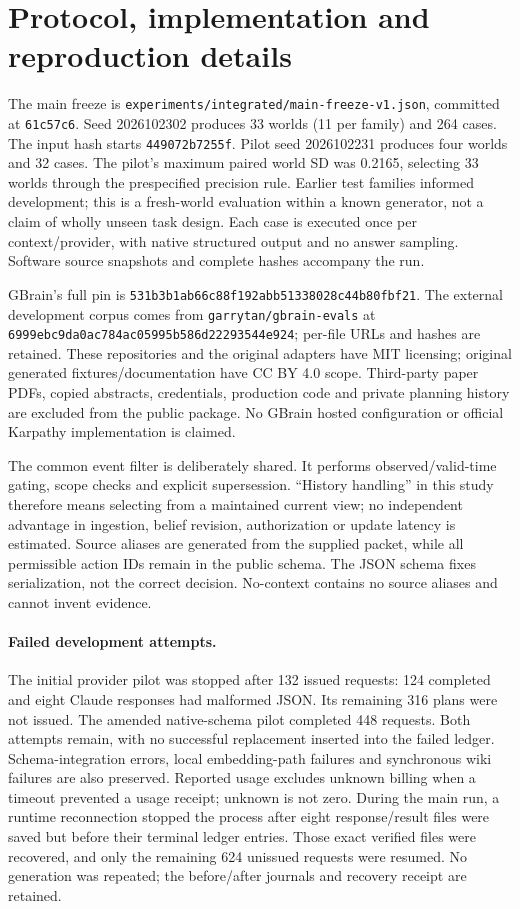 \section{Protocol, implementation and reproduction details}
\label{sec:reproduce}
The main freeze is \texttt{experiments/integrated/main-freeze-v1.json}, committed at \texttt{61c57c6}. Seed 2026102302 produces 33 worlds (11 per family) and 264 cases. The input hash starts \texttt{449072b7255f}. Pilot seed 2026102231 produces four worlds and 32 cases. The pilot's maximum paired world SD was 0.2165, selecting 33 worlds through the prespecified precision rule. Earlier test families informed development; this is a fresh-world evaluation within a known generator, not a claim of wholly unseen task design. Each case is executed once per context/provider, with native structured output and no answer sampling. Software source snapshots and complete hashes accompany the run.

GBrain's full pin is \texttt{531b3b1ab66c88f192abb51338028c44b80fbf21}. The external development corpus comes from \texttt{garrytan/gbrain-evals} at \texttt{6999ebc9da0ac784ac05995b586d22293544e924}; per-file URLs and hashes are retained. These repositories and the original adapters have MIT licensing; original generated fixtures/documentation have CC BY 4.0 scope. Third-party paper PDFs, copied abstracts, credentials, production code and private planning history are excluded from the public package. No GBrain hosted configuration or official Karpathy implementation is claimed.

The common event filter is deliberately shared. It performs observed/valid-time gating, scope checks and explicit supersession. ``History handling'' in this study therefore means selecting from a maintained current view; no independent advantage in ingestion, belief revision, authorization or update latency is estimated. Source aliases are generated from the supplied packet, while all permissible action IDs remain in the public schema. The JSON schema fixes serialization, not the correct decision. No-context contains no source aliases and cannot invent evidence.

\paragraph{Failed development attempts.}
The initial provider pilot was stopped after 132 issued requests: 124 completed and eight Claude responses had malformed JSON. Its remaining 316 plans were not issued. The amended native-schema pilot completed 448 requests. Both attempts remain, with no successful replacement inserted into the failed ledger. Schema-integration errors, local embedding-path failures and synchronous wiki failures are also preserved. Reported usage excludes unknown billing when a timeout prevented a usage receipt; unknown is not zero. During the main run, a runtime reconnection stopped the process after eight response/result files were saved but before their terminal ledger entries. Those exact verified files were recovered, and only the remaining 624 unissued requests were resumed. No generation was repeated; the before/after journals and recovery receipt are retained.

